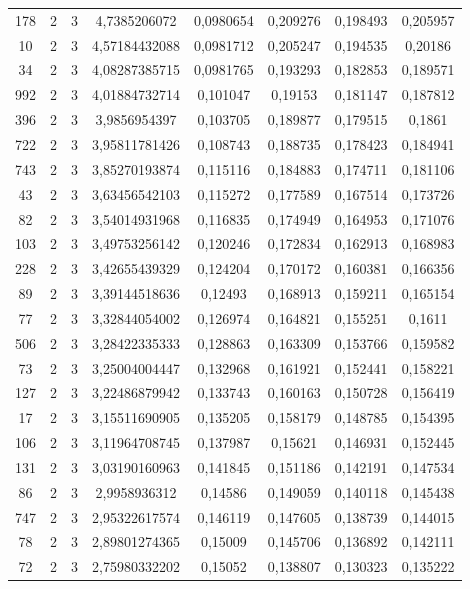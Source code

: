 \begin{longtable}{|c|c|c|c|c|c|c|c|}
178 & 2 & 3 & 4,7385206072 & 0,0980654 & 0,209276 & 0,198493 & 0,205957 \\
10 & 2 & 3 & 4,57184432088 & 0,0981712 & 0,205247 & 0,194535 & 0,20186 \\
34 & 2 & 3 & 4,08287385715 & 0,0981765 & 0,193293 & 0,182853 & 0,189571 \\
992 & 2 & 3 & 4,01884732714 & 0,101047 & 0,19153 & 0,181147 & 0,187812 \\
396 & 2 & 3 & 3,9856954397 & 0,103705 & 0,189877 & 0,179515 & 0,1861 \\
722 & 2 & 3 & 3,95811781426 & 0,108743 & 0,188735 & 0,178423 & 0,184941 \\
743 & 2 & 3 & 3,85270193874 & 0,115116 & 0,184883 & 0,174711 & 0,181106 \\
43 & 2 & 3 & 3,63456542103 & 0,115272 & 0,177589 & 0,167514 & 0,173726 \\
82 & 2 & 3 & 3,54014931968 & 0,116835 & 0,174949 & 0,164953 & 0,171076 \\
103 & 2 & 3 & 3,49753256142 & 0,120246 & 0,172834 & 0,162913 & 0,168983 \\
228 & 2 & 3 & 3,42655439329 & 0,124204 & 0,170172 & 0,160381 & 0,166356 \\
89 & 2 & 3 & 3,39144518636 & 0,12493 & 0,168913 & 0,159211 & 0,165154 \\
77 & 2 & 3 & 3,32844054002 & 0,126974 & 0,164821 & 0,155251 & 0,1611 \\
506 & 2 & 3 & 3,28422335333 & 0,128863 & 0,163309 & 0,153766 & 0,159582 \\
73 & 2 & 3 & 3,25004004447 & 0,132968 & 0,161921 & 0,152441 & 0,158221 \\
127 & 2 & 3 & 3,22486879942 & 0,133743 & 0,160163 & 0,150728 & 0,156419 \\
17 & 2 & 3 & 3,15511690905 & 0,135205 & 0,158179 & 0,148785 & 0,154395 \\
106 & 2 & 3 & 3,11964708745 & 0,137987 & 0,15621 & 0,146931 & 0,152445 \\
131 & 2 & 3 & 3,03190160963 & 0,141845 & 0,151186 & 0,142191 & 0,147534 \\
86 & 2 & 3 & 2,9958936312 & 0,14586 & 0,149059 & 0,140118 & 0,145438 \\
747 & 2 & 3 & 2,95322617574 & 0,146119 & 0,147605 & 0,138739 & 0,144015 \\
78 & 2 & 3 & 2,89801274365 & 0,15009 & 0,145706 & 0,136892 & 0,142111 \\
72 & 2 & 3 & 2,75980332202 & 0,15052 & 0,138807 & 0,130323 & 0,135222 \\

\end{longtable}
